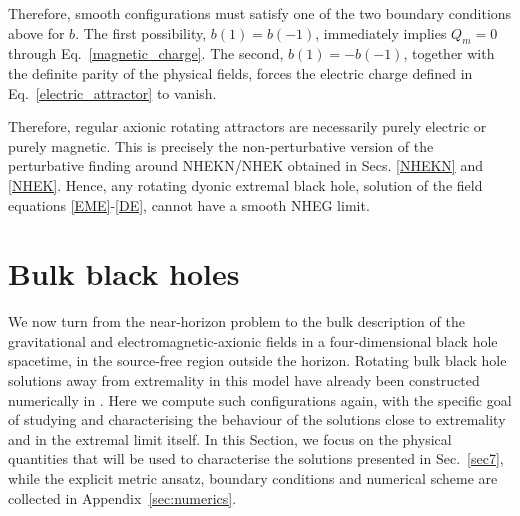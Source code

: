 \documentclass[11pt]{article}
\numberwithin{equation}{section} %
\begin{document}
Therefore,  {smooth configurations must satisfy one of the two boundary conditions above for $b$. The first possibility, $b(1)=b(-1)$, immediately implies $Q_m=0$ through Eq.~\eqref{magnetic_charge}. The second, $b(1)=-b(-1)$, together with the definite parity of the physical fields, forces the electric charge defined in Eq.~\eqref{electric_attractor} to vanish.}



{Therefore,}  regular axionic rotating attractors are necessarily purely electric or purely magnetic. This is precisely the non‑perturbative version of the perturbative finding around NHEKN/NHEK obtained in Secs. \ref{NHEKN} and \ref{NHEK}. Hence, any rotating dyonic extremal black hole, solution of the field equations \eqref{EME}-\eqref{DE}, cannot have a smooth NHEG limit.

\bigskip


\section{Bulk black holes}\label{sec4}

We now turn from the near-horizon problem to the bulk description of the gravitational and electromagnetic-axionic fields in a four-dimensional black hole spacetime, in the source-free region outside the horizon. Rotating bulk black hole solutions away from extremality in this model have already been constructed numerically in \cite{Burrage:2023zvk}. Here we compute such configurations again, with the specific goal of studying and characterising the behaviour of the solutions close to extremality and in the extremal limit itself. In this Section, we focus on the physical quantities that will be used to characterise the solutions presented in Sec.~\ref{sec7}, while the explicit metric ansatz, boundary conditions and numerical scheme are collected in Appendix~\ref{sec:numerics}.
\end{document}
